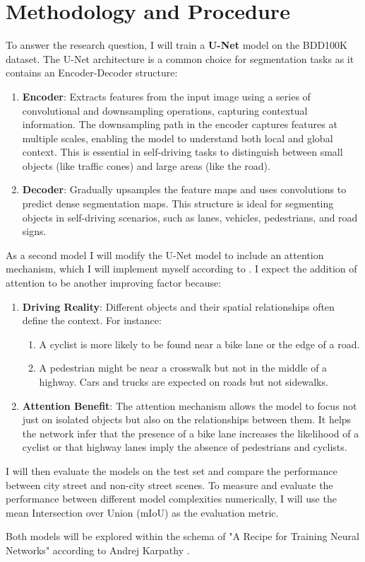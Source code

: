 \section{Methodology and Procedure}
To answer the research question, I will train a \textbf{U-Net} model on the BDD100K dataset. The U-Net architecture is a common choice for segmentation tasks as it contains an Encoder-Decoder structure:
\begin{enumerate}
    \item \textbf{Encoder}: Extracts features from the input image using a series of convolutional and downsampling operations, capturing contextual information. The downsampling path in the encoder captures features at multiple scales, enabling the model to understand both local and global context. This is essential in self-driving tasks to distinguish between small objects (like traffic cones) and large areas (like the road).
    \item \textbf{Decoder}: Gradually upsamples the feature maps and uses convolutions to predict dense segmentation maps. This structure is ideal for segmenting objects in self-driving scenarios, such as lanes, vehicles, pedestrians, and road signs.
\end{enumerate}

As a second model I will modify the U-Net model to include an attention mechanism, which I will implement myself according to \cite{oktayAttentionUNetLearning2018}. I expect the addition of attention to be another improving factor because:
\begin{enumerate}
    \item \textbf{Driving Reality}: Different objects and their spatial relationships often define the context. For instance:
    \begin{enumerate}
        \item  A cyclist is more likely to be found near a bike lane or the edge of a road.
        \item A pedestrian might be near a crosswalk but not in the middle of a highway.
        Cars and trucks are expected on roads but not sidewalks.
    \end{enumerate} 
    \item \textbf{Attention Benefit}: The attention mechanism allows the model to focus not just on isolated objects but also on the relationships between them. It helps the network infer that the presence of a bike lane increases the likelihood of a cyclist or that highway lanes imply the absence of pedestrians and cyclists.
\end{enumerate}

I will then evaluate the models on the test set and compare the performance between city street and non-city street scenes. To measure and evaluate the performance between different model complexities numerically, I will use the mean Intersection over Union (mIoU) as the evaluation metric.

Both models will be explored within the schema of "A Recipe for Training Neural Networks" according to Andrej Karpathy \cite{karpathyRecipeTrainingNeural2019}.